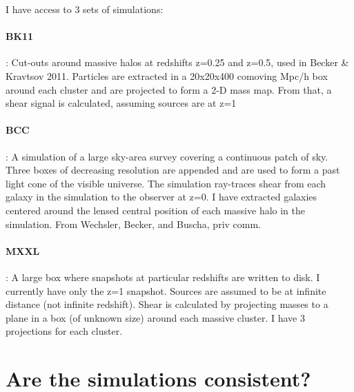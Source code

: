 \documentclass[11pt]{article}
\begin{document}
I have access to 3 sets of simulations:

\paragraph{BK11} : Cut-outs around massive halos at redshifts z=0.25 and z=0.5, used in Becker \& Kravtsov 2011. Particles are extracted in a 20x20x400 comoving Mpc/h box around each cluster and are projected to form a 2-D mass map. From that, a shear signal is calculated, assuming sources are at z=1

\paragraph{BCC} : A simulation of a large sky-area survey covering a continuous patch of sky. Three boxes of decreasing resolution are appended and are used to form a past light cone of the visible universe. The simulation ray-traces shear from each galaxy in the simulation to the observer at z=0. I have extracted galaxies centered around the lensed central position of each massive halo in the simulation. From Wechsler, Becker, and Buscha, priv comm.

\paragraph{MXXL}: A large box where snapshots at particular redshifts are written to disk. I currently have only the z=1 snapshot. Sources are assumed to be at infinite distance (not infinite redshift). Shear is calculated by projecting masses to a plane in a box (of unknown size) around each massive cluster. I have 3 projections for each cluster.


\clearpage \newpage


\section{Are the simulations consistent?}
\end{document}
